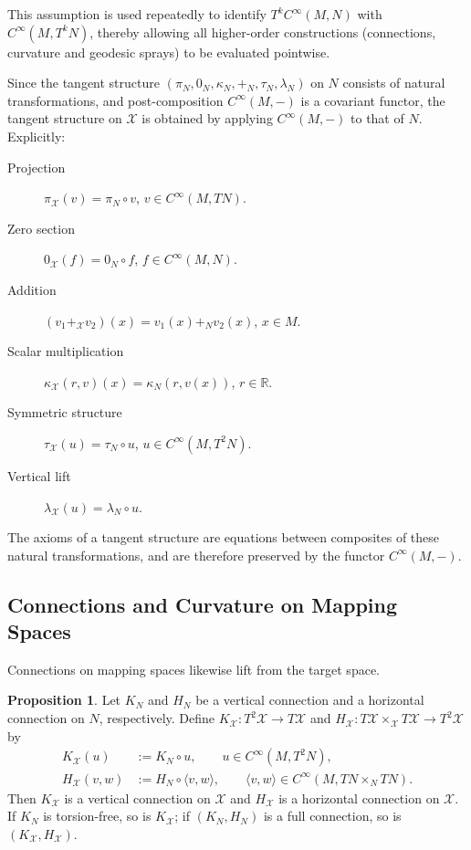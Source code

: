 \documentclass{amsart}
\newcommand{\R}{\mathbb{R}}
\newcommand{\X}{\mathcal{X}}
\theoremstyle{definition}
\newtheorem{prop}[thm]{Proposition}
\begin{document}
This assumption is used repeatedly to identify
$T^kC^\infty(M,N)$
with
$C^\infty(M,T^kN)$,
thereby allowing all higher-order constructions (connections, curvature and geodesic sprays) to be evaluated pointwise.

Since the tangent structure $(\pi_N, 0_N, \kappa_N, +_N, \tau_N, \lambda_N)$ on $N$ consists of natural transformations, and post-composition $C^\infty(M, -)$ is a covariant functor, the tangent structure on $\X$ is obtained by applying $C^\infty(M, -)$ to that of $N$. Explicitly:
\begin{description}
  \item[Projection]
    $\pi_{\X}(v) = \pi_N \circ v$,\quad
    $v \in C^\infty(M, TN)$.
  \item[Zero section]
    $0_{\X}(f) = 0_N \circ f$,\quad
    $f \in C^\infty(M, N)$.
  \item[Addition]
    $(v_1 +_{\X} v_2)(x) = v_1(x) +_N v_2(x)$,\quad
    $x \in M$.
  \item[Scalar multiplication]
    $\kappa_{\X}(r, v)(x) = \kappa_N(r, v(x))$,\quad
    $r \in \R$.
  \item[Symmetric structure]
    $\tau_{\X}(u) = \tau_N \circ u$,\quad
    $u \in C^\infty(M, T^2N)$.
  \item[Vertical lift]
    $\lambda_{\X}(u) = \lambda_N \circ u$.
\end{description}
The axioms of a tangent structure are equations between composites of these
natural transformations, and are therefore preserved by the functor
$C^\infty(M, -)$.

\subsection{Connections and Curvature on Mapping Spaces}%
\label{subsec:mapping-connection}

Connections on mapping spaces likewise lift from the target space.

\begin{prop}\label{prop:mapping-space-connection}
 Let $K_N$ and $H_N$ be a vertical connection and a horizontal connection on
 $N$, respectively. Define
 $K_{\X} \colon T^2\X \to T\X$ and
 $H_{\X} \colon T\X \times_{\X} T\X \to T^2\X$ by
 \begin{align*}
   K_{\X}(u) &:= K_N \circ u,
     \qquad u \in C^\infty(M, T^2N),\\
   H_{\X}(v, w) &:= H_N \circ \langle v, w \rangle,
     \qquad \langle v, w \rangle \in C^\infty(M, TN \times_N TN).
 \end{align*}
 Then $K_{\X}$ is a vertical connection on $\X$ and $H_{\X}$ is a horizontal
 connection on $\X$. If $K_N$ is torsion-free, so is $K_{\X}$; if $(K_N, H_N)$
 is a full connection, so is $(K_{\X}, H_{\X})$.
\end{prop}
\end{document}
